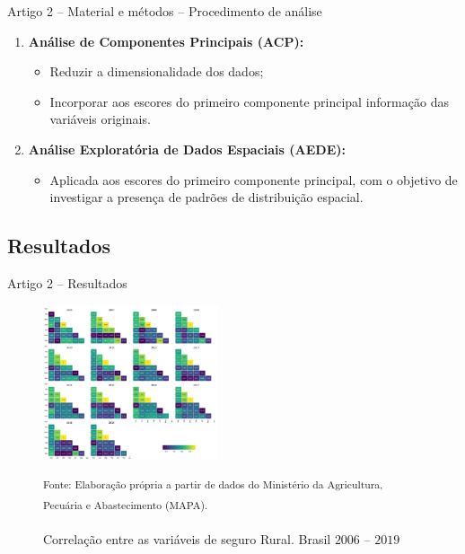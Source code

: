 \documentclass[aspectratio=169]{beamer}
\begin{document}
\begin{frame}{Artigo 2 -- Material e métodos -- Procedimento de análise}
    \begin{enumerate}
        \item \textbf{Análise de Componentes Principais (ACP):} 
        \begin{itemize}
            \item Reduzir a dimensionalidade dos dados;
            \item Incorporar aos escores do primeiro componente principal informação das variáveis originais. 
        \end{itemize}
        \item \textbf{Análise Exploratória de Dados Espaciais (AEDE):} 
        \begin{itemize}
            \item Aplicada aos escores do primeiro componente principal, com o objetivo de investigar a presença de padrões de distribuição espacial.
        \end{itemize}
    \end{enumerate}
\end{frame}

\subsection{Resultados}

\begin{frame}{Artigo 2 -- Resultados}
	\begin{figure}
		\centering
		\includegraphics[width=0.46\textwidth]{img/corr_anos.png}
		\caption{Correlação entre as variáveis de seguro Rural. Brasil $2006$ -- $2019$}
		\small \textsuperscript {Fonte: Elaboração própria a partir de dados do Ministério da Agricultura, Pecuária e Abastecimento (MAPA).}
	\end{figure}
\end{frame}
\end{document}
